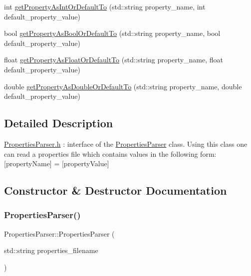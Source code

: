 \begin{DoxyCompactItemize}
\item 
int \mbox{\hyperlink{class_properties_parser_adadd7db8ea323a727804905d59f59d6d}{get\+Property\+As\+Int\+Or\+Default\+To}} (std\+::string property\+\_\+name, int default\+\_\+property\+\_\+value)
\item 
bool \mbox{\hyperlink{class_properties_parser_a8e5c2fd64020dd3a580457ca321179ec}{get\+Property\+As\+Bool\+Or\+Default\+To}} (std\+::string property\+\_\+name, bool default\+\_\+property\+\_\+value)
\item 
float \mbox{\hyperlink{class_properties_parser_a064cd4ecb149c7aa710d2c016a6d3371}{get\+Property\+As\+Float\+Or\+Default\+To}} (std\+::string property\+\_\+name, float default\+\_\+property\+\_\+value)
\item 
double \mbox{\hyperlink{class_properties_parser_a12598ce9403dd9e51f2a1206db9a27a9}{get\+Property\+As\+Double\+Or\+Default\+To}} (std\+::string property\+\_\+name, double default\+\_\+property\+\_\+value)
\end{DoxyCompactItemize}


\subsection{Detailed Description}
\mbox{\hyperlink{_properties_parser_8h_source}{Properties\+Parser.\+h}} \+: interface of the \mbox{\hyperlink{class_properties_parser}{Properties\+Parser}} class. Using this class one can read a properties file which contains values in the following form\+: \mbox{[}property\+Name\mbox{]} = \mbox{[}property\+Value\mbox{]} 

\subsection{Constructor \& Destructor Documentation}
\mbox{\label{class_properties_parser_a9fe7a2c812424ebf8db6c3c5afc50f65}} 
\subsubsection{\texorpdfstring{Properties\+Parser()}{PropertiesParser()}}
{\footnotesize\ttfamily Properties\+Parser\+::\+Properties\+Parser (\begin{DoxyParamCaption}\item[{std\+::string}]{properties\+\_\+filename }\end{DoxyParamCaption})}

